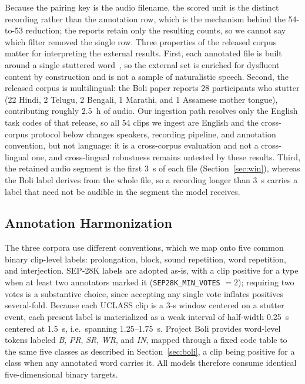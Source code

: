 \documentclass[a4paper,orivec]{llncs}
\begin{document}
Because the pairing key is the audio filename, the scored unit is the distinct
recording rather than the annotation row, which is the mechanism behind the
54-to-53 reduction; the reports retain only the resulting counts, so we cannot say
which filter removed the single row. Three properties of the released corpus
matter for interpreting the external results. First, each annotated file is built
around a single stuttered word~\cite{boli2025}, so the external set is enriched
for dysfluent content by construction and is not a sample of naturalistic speech.
Second, the released corpus is multilingual: the Boli paper reports 28 participants who
stutter (22 Hindi, 2 Telugu, 2 Bengali, 1 Marathi, and 1 Assamese mother tongue),
contributing roughly 2.5~h of audio. Our ingestion path resolves only the English
task codes of that release, so all 54 clips we ingest are English and the
cross-corpus protocol below changes speakers, recording pipeline, and annotation
convention, but not language: it is a cross-corpus evaluation and not a
cross-lingual one, and cross-lingual robustness remains untested by these results.
Third, the retained audio segment is the first 3~s of
each file (Section~\ref{sec:win}), whereas the Boli label derives from the whole
file, so a recording longer than 3~s carries a label that need not be audible in
the segment the model receives.

\subsection{Annotation Harmonization}
The three corpora use different conventions, which we map onto five common
binary clip-level labels: prolongation, block, sound repetition, word
repetition, and interjection. SEP-28K labels are adopted as-is, with a clip
positive for a type when at least two annotators marked it
(\texttt{SEP28K\_MIN\_VOTES} $=2$); requiring two votes is a substantive choice,
since accepting any single vote inflates positives several-fold. Because each
UCLASS clip is a 3-s window centered on a stutter event, each present label is
materialized as a weak interval of half-width 0.25~s centered at 1.5~s, i.e.\
spanning 1.25--1.75~s. Project Boli provides
word-level tokens labeled \emph{B}, \emph{PR}, \emph{SR}, \emph{WR}, and
\emph{IN}, mapped through a fixed code table to the same five classes as
described in Section~\ref{sec:boli}, a clip being positive for a class when any
annotated word carries it. All models therefore consume identical
five-dimensional binary targets.
\end{document}
